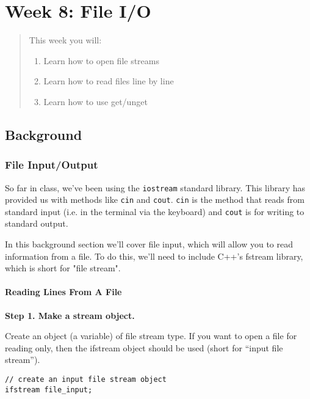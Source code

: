 \chapter*{Week 8: File I/O}
\setcounter{chapter}{9}
\setcounter{section}{0}

\begin{abstract}
This week you will:
\begin{enumerate}
    \item Learn how to open file streams
    \item Learn how to read files line by line
    \item Learn how to use get/unget

\end{enumerate}
    
\end{abstract}

\section{Background}
\subsection{File Input/Output}
So far in class, we've been using the \texttt{iostream} standard library. This library has provided us with methods like \texttt{cin} and \texttt{cout}. \texttt{cin} is the method that reads from standard input (i.e. in the terminal via the keyboard) and \texttt{cout} is for writing to standard output.

In this background section we'll cover file input, which will allow you to read information from a file. To do this, we'll need to include C++'s fstream library, which is short for "file stream".

\subsubsection{Reading Lines From A File}

\textbf{Step 1. Make a stream object.}

Create an object (a variable) of file stream type. If you want to open a file for reading only, then the ifstream object should be used (short for “input file stream”).

\begin{verbatim}
// create an input file stream object
ifstream file_input;
\end{verbatim}


